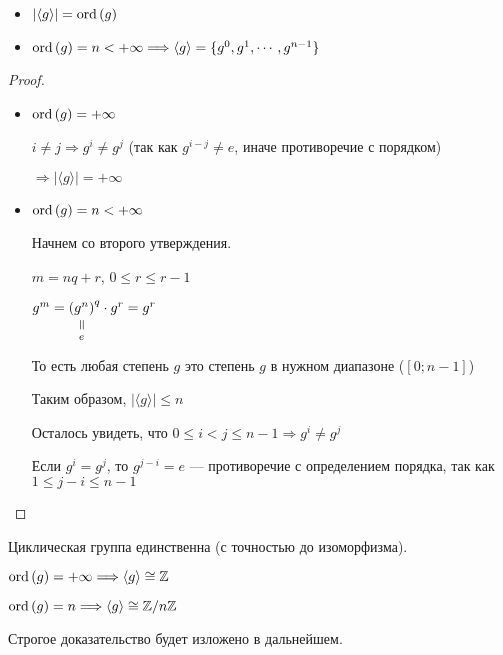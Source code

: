 \begin{theorem-non} \quad

  \begin{itemize}
  \item $|\langle g \rangle| = \operatorname{ord}\left( g \right)$
  \item $\operatorname{ord}\left( g \right) = n < +\infty \Longrightarrow \langle g \rangle = \{ g^0, g^1, \cdots, g^{n-1} \}$
  \end{itemize}

\begin{proof} \quad

  \begin{itemize}
    \item $\operatorname{ord}\left( g \right) = +\infty$

    $i \neq j \Longrightarrow g^i \neq g^j$ (так как $g^{i-j} \neq e$, иначе противоречие с порядком)

    $\Longrightarrow |\langle g \rangle| = +\infty$
    
    \item $\operatorname{ord}\left( g \right) = n < +\infty$
    
    Начнем со второго утверждения. 
    
    $m = nq + r$, $0 \leq r \leq r - 1$
    
    $g^m = \equalto{(g^n)}{e}^q \cdot g^r = g^r$

    То есть любая степень $g$ это степень $g$ в нужном диапазоне ($[0; n-1]$)

    Таким образом, $|\langle g \rangle| \leq n$

    Осталось увидеть, что $0 \leq i < j \leq n - 1 \Longrightarrow g^i\neq g^j $

    Если $g^i = g^j$, то $g^{j-i} = e$ --- противоречие с определением порядка, так как $1 \leq j - i \leq n - 1$
  \end{itemize}
\end{proof}
\end{theorem-non}

\notice Циклическая группа единственна (с точностью до изоморфизма).

$\operatorname{ord}\left( g \right) = +\infty \Longrightarrow \langle g \rangle \cong \mathbb{Z}$

$\operatorname{ord}\left( g \right) = n \Longrightarrow \langle g \rangle \cong \mathbb{Z}/n \mathbb{Z}$

Строгое доказательство будет изложено в дальнейшем.

